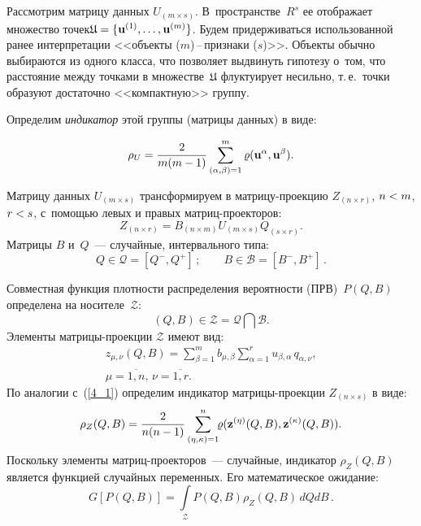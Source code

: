 \begin{multicols}{2}
Рассмотрим матрицу данных $U_{(m \times s)}$. В~пространстве~$R^s$ ее 
отображает множество точек\linebreak $\mathfrak{U} \hm= \{\mathbf{u}^{(1)}, \dots, 
\mathbf{u}^{(m)}\}$. Будем придерживаться использованной ранее интерпретации 
<<объекты ($m$)\,--\,приз\-на\-ки ($s$)>>. Объекты обычно выбираются из одного 
класса, что позволяет выдвинуть гипотезу о~том, что расстояние между точками 
в множестве~$\mathfrak{U}$ флуктуирует несильно, т.\,е.\ точки образуют 
достаточно <<компактную>> группу.

Определим \textit{индикатор} этой группы (матрицы данных) в виде:

\noindent
\begin{equation}
\label{4_1}
\rho_U = \displaystyle\frac{\displaystyle 2\mathstrut}{\displaystyle m(m-1)\mathstrut} \sum\limits^m_{(\alpha,\beta)=1} 
\varrho(\mathbf{u}^{\alpha}, \mathbf{u}^{\beta}).
\end{equation}

Матрицу данных $U_{(m \times s)}$ трансформируем 
в мат\-ри\-цу-про\-ек\-цию $Z_{(n \times r)}$, $n \hm< m$, $r \hm< s$, 
с~по\-мощью левых и правых мат\-риц-про\-ек\-то\-ров:
\begin{equation*}
Z_{(n \times r)} = B_{(n \times m)} U_{(m \times s)} Q_{(s \times r)}.
\end{equation*}
Матрицы $B$ и~$Q$~--- случайные, интервального типа:
\begin{equation*}
Q \in \mathcal{Q} = [Q^-, Q^+]\,;\qquad B \in \mathcal{B} = [B^-, B^+]\,.
\end{equation*}

\noindent
Совместная функция плотности распределения ве\-ро\-ят\-ности (ПРВ)~$P(Q,B)$  определена на 
носителе~$\mathcal{Z}$:
\begin{equation*}
(Q,B) \in \mathcal{Z} = \mathcal{Q} \bigcap \mathcal{B}.
\end{equation*}
Элементы матрицы-проекции $\mathcal{Z}$ имеют вид:
\begin{multline*}
\label{4_5}
z_{\mu,\nu}(Q,B) = \sum\limits^m_{\beta=1} b_{\mu,\beta} 
\sum\limits^r_{\alpha=1} u_{\beta,\alpha}\,q_{\alpha,\nu},\\ \mu = 
\overline{1,n},\,\nu = \overline{1,r}.
\end{multline*}
По аналогии с~(\ref{4_1}) определим индикатор мат\-ри\-цы-про\-ек\-ции $Z_{(n 
\times s)}$ в виде:
\begin{equation*}
\rho_Z(Q,B) = \displaystyle\frac{\displaystyle 2\mathstrut}{\displaystyle n(n-1)\mathstrut}\sum\limits^n_{(\eta, 
\kappa)=1}\!\!\varrho(\mathbf{z}^{(\eta)}(Q,B), \mathbf{z}^{(\kappa)}(Q,B)).
\end{equation*}
Поскольку элементы мат\-риц-про\-ек\-то\-ров~--- случайные, индикатор $\rho_Z(Q,B)$ 
является функцией случайных переменных. Его математическое ожидание:
\begin{equation*}
G[P(Q,B)] = \int\limits_{\mathcal{Z}} P(Q,B) \rho_Z(Q,B)\,dQ dB\,.
\end{equation*}


\end{multicols}

